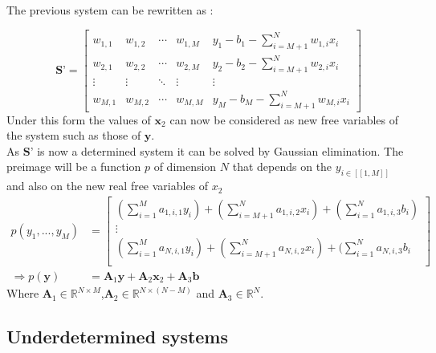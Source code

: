 \documentclass{article}
\begin{document}
    The previous system can be rewritten as : 

    \begin{equation*}
        \textbf{S'}= \left[\begin{array}{cccc|c}  
        w_{1,1} & w_{1,2} & \cdots & w_{1,M} & y_{1}-b_{1} - \sum_{i=M+1}^{N} w_{1,i}x_{i}\\
        w_{2,1} & w_{2,2} & \cdots & w_{2,M} & y_{2}-b_{2} - \sum_{i=M+1}^{N} w_{2,i}x_{i}\\
        \vdots  & \vdots  & \ddots & \vdots & \vdots\\
        w_{M,1} & w_{M,2} & \cdots & w_{M,M} & y_{M}-b_{M} - \sum_{i=M+1}^{N} w_{M,i}x_{i}
       \end{array}\right]
    \end{equation*}
    Under this form the values of $\textbf{x}_{2}$ can now be considered as new free variables of the system such as those of $\textbf{y}$.\\
    As $\textbf{S'}$ is now a determined system it can be solved by Gaussian elimination.
    The preimage will be a function $p$ of dimension $N$ that depends on the $y_{i \in [\![1,M]\!]}$ 
    and also on the new real free variables of $x_{2}$\\
    \begin{equation*}
    \begin{split}
        p(y_{1},...,y_{M}) &= 
        \begin{bmatrix}
            (\sum_{i=1}^{M} a_{1,i,1}y_{i})+ (\sum_{i=M+1}^{N} a_{1,i,2}x_{i})  + (\sum_{i=1}^{N} a_{1,i,3}b_{i})\\
            \vdots \\
            (\sum_{i=1}^{M} a_{N,i,1}y_{i})+ (\sum_{i=M+1}^{N} a_{N,i,2}x_{i})  + (\sum_{i=1}^{N} a_{N,i,3}b_{i}\\
        \end{bmatrix}\\
        \Rightarrow p(\textbf{y})&= \textbf{A}_{1}\textbf{y} + \textbf{A}_{2}\textbf{x}_{2}+ \textbf{A}_{3}\textbf{b}
    \end{split}
    \end{equation*}
    Where $\textbf{A}_{1} \in  \mathbb{R}^{N \times M}$,$\textbf{A}_{2} \in  \mathbb{R}^{N \times (N-M)}$ and $\textbf{A}_{3} \in \mathbb{R}^{N}.$

\subsection{Underdetermined systems}
\end{document}

